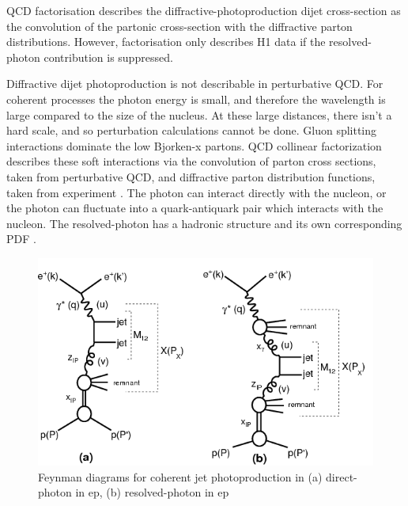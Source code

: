 QCD factorisation describes the diffractive-photoproduction dijet cross-section as the convolution of the partonic cross-section with the diffractive parton distributions. However, factorisation only describes H1 data if the resolved-photon contribution is suppressed. 

Diffractive dijet photoproduction is not describable in perturbative QCD. For coherent processes the photon energy is small, and therefore the wavelength is large compared to the size of the nucleus. At these large distances, there isn't a hard scale, and so perturbation calculations cannot be done. Gluon splitting interactions dominate the low Bjorken-x partons. QCD collinear factorization describes these soft interactions via the convolution of parton cross sections, taken from perturbative QCD, and diffractive parton distribution functions, taken from experiment \cite{Andreev:2015cwa} \cite{Chekanov:2008fh}. The photon can interact directly with the nucleon, or the photon can fluctuate into a quark-antiquark pair which interacts with the nucleon. The resolved-photon has a hadronic structure and its own corresponding PDF \cite{Bauer:1977iq}.

\begin{figure}[]
\begin{centering}
\includegraphics[width=6in]{Chapter1/importfigs/h1_2015_feyn.png}
\par\end{centering}
\caption{Feynman diagrams for coherent jet photoproduction in (a) direct-photon in ep, (b) resolved-photon in ep \cite{Andreev:2015cwa} \label{fig:feynmanUPC1}}
\end{figure}

